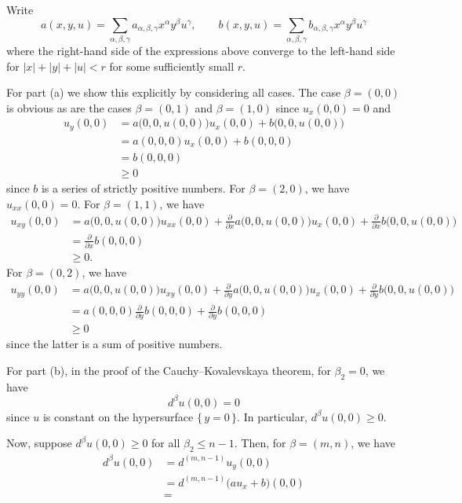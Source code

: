 \begin{solution}
  Write
  \[
    a(x,y,u)=\sum_{\alpha,\beta,\gamma} a_{\alpha,\beta,\gamma}x^\alpha
    y^\beta u^\gamma,%
    \qquad%
    b(x,y,u)=\sum_{\alpha,\beta,\gamma} b_{\alpha,\beta,\gamma}x^\alpha
    y^\beta u^\gamma
  \]
  where the right-hand side of the expressions above converge to the
  left-hand side for \(|x|+|y|+|u|<r\) for some sufficiently small \(r\).

  For part (a) we show this explicitly by considering all cases. The case
  \(\beta=(0,0)\) is obvious as are the cases \(\beta=(0,1)\) and
  \(\beta=(1,0)\) since \(u_x(0,0)=0\) and
  \begin{align*}
    u_y(0,0)
    &=a\bigl(0,0,u(0,0)\bigr)u_x(0,0)+b\bigl( 0,0,u(0,0) \bigr)\\
    &=a(0,0,0)u_x(0,0)+b(0,0,0)\\
    &=b(0,0,0)\\
    &\geq 0
  \end{align*}
  since \(b\) is a series of strictly positive numbers. For
  \(\beta=(2,0)\), we have \(u_{xx}(0,0)=0\). For \(\beta=(1,1)\), we have
  \begin{align*}
    u_{xy}(0,0)&=a\bigl(0,0,u(0,0)\bigr)u_{xx}(0,0)+\frac{\partial}{\partial
                 x}a\bigl( 0,0,u(0,0) \bigr)u_x(0,0)
                 +\frac{\partial}{\partial x} b\bigl(0,0,u(0,0)\bigr)\\
               &=\frac{\partial}{\partial x} b(0,0,0)\\
               &\geq 0.
  \end{align*}
  For \(\beta=(0,2)\), we have
  \begin{align*}
    u_{yy}(0,0)&=a\bigl(0,0,u(0,0)\bigr)u_{xy}(0,0)+\frac{\partial}{\partial
                 y}a\bigl( 0,0,u(0,0) \bigr)u_x(0,0)
                 +\frac{\partial}{\partial y} b\bigl(0,0,u(0,0)\bigr)\\
               &=a(0,0,0)\frac{\partial}{\partial
                 y}b(0,0,0)+\frac{\partial}{\partial y}b(0,0,0)\\
               &\geq 0
  \end{align*}
  since the latter is a sum of positive numbers.

  For part (b), in the proof of the Cauchy--Kovalevskaya theorem, for
  \(\beta_2=0\), we have
  \[
    d^\beta u(0,0)=0
  \]
  since \(u\) is constant on the hypersurface \(\{\,y=0\,\}\). In
  particular, \(d^\beta u(0,0)\geq 0\).

  Now, suppose \(d^\beta u(0,0)\geq 0\) for all \(\beta_2\leq n-1\). Then,
  for \(\beta=(m,n)\), we have
  \begin{align*}
    d^\beta u(0,0)
    &=d^{(m,n-1)} u_y(0,0)\\
    &=d^{(m,n-1)}\bigl(au_x+b\bigr)(0,0)\\
    &=
  \end{align*}
\end{solution}
\newpage

